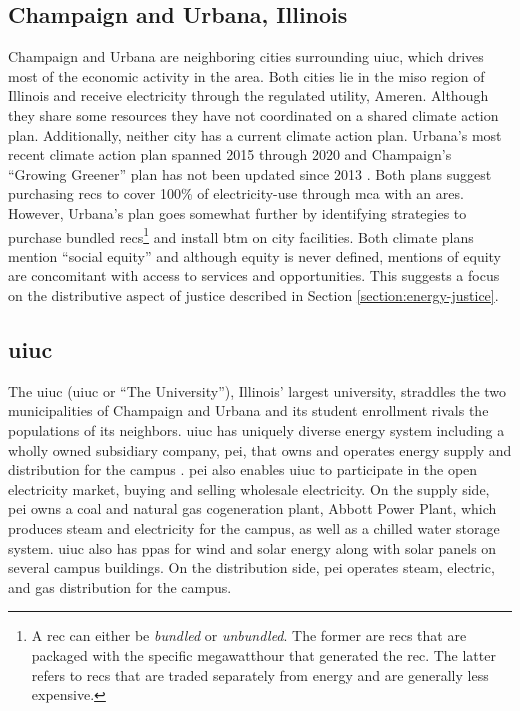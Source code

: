 \subsection{Champaign and Urbana, Illinois}
Champaign and Urbana are neighboring cities surrounding \ac{uiuc}, which drives
most of the economic activity in the area. Both cities lie in the \ac{miso}
region of Illinois and receive electricity through the regulated utility,
Ameren. Although they share some resources they have not coordinated on a shared
climate action plan. Additionally, neither city has a current climate action
plan. Urbana's most recent climate action plan spanned 2015 through 2020
\cite{ryan_climate_2014} and Champaign's ``Growing Greener'' plan has not been
updated since 2013 \cite{knight_champaign_2013}. Both plans suggest purchasing
\acp{rec} to cover 100\% of electricity-use through \ac{mca} with an \ac{ares}.
However, Urbana's plan goes somewhat further by identifying strategies to
purchase bundled \acp{rec}\footnote{A \ac{rec} can either be \textit{bundled} or
\textit{unbundled}. The former are \acp{rec} that are packaged with the specific
megawatthour that generated the \ac{rec}. The latter refers to \acp{rec} that
are traded separately from energy and are generally less expensive.} and install
\ac{btm} on city facilities. Both climate plans mention ``social equity'' and
although equity is never defined, mentions of equity are concomitant with access
to services and opportunities. This suggests a focus on the distributive aspect
of justice described in Section \ref{section:energy-justice}.

\subsection{\acf{uiuc}} 

The \acl{uiuc} (\acs{uiuc} or ``The University''), Illinois' largest university,
straddles the two municipalities of Champaign and Urbana and its student
enrollment rivals the populations of its neighbors. \ac{uiuc} has uniquely
diverse energy system including a wholly owned subsidiary company, \ac{pei},
that owns and operates energy supply and distribution for the campus
\cite{affiliated_engineers_inc_utilities_2015}. \ac{pei} also enables \ac{uiuc}
to participate in the open electricity market, buying and selling wholesale
electricity. On the supply side, \ac{pei} owns a coal and natural gas
cogeneration plant, Abbott Power Plant, which produces steam and electricity for
the campus, as well as a chilled water storage system. \ac{uiuc} also has
\acp{ppa} for wind \cite{breitweiser_wind_2016} and solar energy
\cite{white_solar_2017, white_solar_2020} along with solar panels on several
campus buildings. On the distribution side, \ac{pei} operates steam, electric,
and gas distribution for the campus. 

